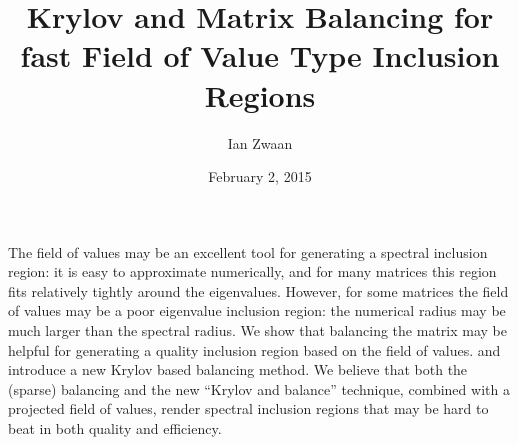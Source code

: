 \documentclass{article}
\title{Krylov and Matrix Balancing for fast Field of Value Type Inclusion Regions}
\author{Ian Zwaan}
\affil{PhD student at TU/e}
\date{February 2, 2015}
\begin{document}
\maketitle
\setcounter{page}{6}
The field of values may be an excellent tool for generating a spectral
inclusion region: it is easy to approximate numerically, and for many
matrices this region fits relatively tightly around the eigenvalues.
However, for some matrices the field of values may be a poor eigenvalue
inclusion region: the numerical radius may be much larger than the
spectral radius. We show that balancing the matrix may be helpful for
generating a quality inclusion region based on the field of values. and
introduce a new Krylov based balancing method. We believe that both the
(sparse) balancing and the new ``Krylov and balance'' technique,
combined with a projected field of values, render spectral inclusion
regions that may be hard to beat in both quality and efficiency.
\end{document}
